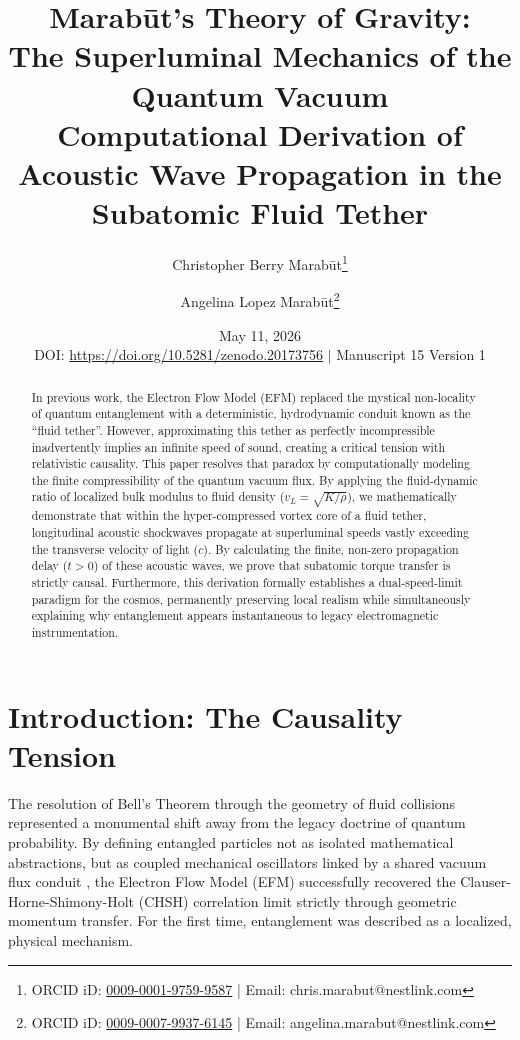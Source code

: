\documentclass[11pt, a4paper]{article}
\title{\textbf{Marab\={u}t's Theory of Gravity: \\ The Superluminal Mechanics of the Quantum Vacuum} \\[1em] \large{Computational Derivation of Acoustic Wave Propagation in the Subatomic Fluid Tether}}
\author[1]{Christopher Berry Marab\={u}t\thanks{ORCID iD: \href{https://orcid.org/0009-0001-9759-9587}{0009-0001-9759-9587} | Email: chris.marabut@nestlink.com}}
\author[1]{Angelina Lopez Marab\={u}t\thanks{ORCID iD: \href{https://orcid.org/0009-0007-9937-6145}{0009-0007-9937-6145} | Email: angelina.marabut@nestlink.com}}
\affil[1]{Independent Researchers}
\date{May 11, 2026 \\[1.5em] \small{DOI: \url{https://doi.org/10.5281/zenodo.20173756} $|$ Manuscript 15 Version 1}}
\begin{document}

\maketitle

\begin{abstract}
  In previous work, the Electron Flow Model (EFM) replaced the mystical non-locality of quantum entanglement with a deterministic, hydrodynamic conduit known as the ``fluid tether''. However, approximating this tether as perfectly incompressible inadvertently implies an infinite speed of sound, creating a critical tension with relativistic causality. This paper resolves that paradox by computationally modeling the finite compressibility of the quantum vacuum flux. By applying the fluid-dynamic ratio of localized bulk modulus to fluid density ($v_L = \sqrt{K/\rho}$), we mathematically demonstrate that within the hyper-compressed vortex core of a fluid tether, longitudinal acoustic shockwaves propagate at superluminal speeds vastly exceeding the transverse velocity of light ($c$). By calculating the finite, non-zero propagation delay ($t > 0$) of these acoustic waves, we prove that subatomic torque transfer is strictly causal. Furthermore, this derivation formally establishes a dual-speed-limit paradigm for the cosmos, permanently preserving local realism while simultaneously explaining why entanglement appears instantaneous to legacy electromagnetic instrumentation.
\end{abstract}

\section{Introduction: The Causality Tension}
  The resolution of Bell's Theorem \cite{bell1964} through the geometry of fluid collisions \cite{marabut2026m14} represented a monumental shift away from the legacy doctrine of quantum probability. By defining entangled particles not as isolated mathematical abstractions, but as coupled mechanical oscillators linked by a shared vacuum flux conduit \cite{marabut2026m5}, the Electron Flow Model (EFM) successfully recovered the Clauser-Horne-Shimony-Holt (CHSH) correlation limit strictly through geometric momentum transfer. For the first time, entanglement was described as a localized, physical mechanism.
  
\end{document}
